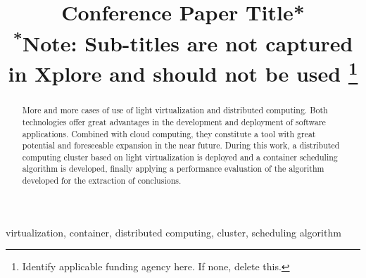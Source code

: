\documentclass[conference]{IEEEtran}
\begin{document}
\title{Conference Paper Title*\\
{\footnotesize \textsuperscript{*}Note: Sub-titles are not captured in Xplore and
should not be used}
\thanks{Identify applicable funding agency here. If none, delete this.}
}

\author{
\and
{}
}

\maketitle

\begin{abstract}
More and more cases of use of light virtualization and distributed computing. Both technologies offer great advantages in the development
and deployment of software applications.
Combined with cloud computing, they constitute a tool with great potential and foreseeable expansion in the near future.
During this work, a distributed computing cluster based on light virtualization is deployed and a container scheduling algorithm is developed, finally applying a
performance evaluation of the algorithm developed for the extraction of conclusions.
\end{abstract}

\begin{IEEEkeywords}
virtualization, container, distributed computing, cluster, scheduling algorithm
\end{IEEEkeywords}
\end{document}
